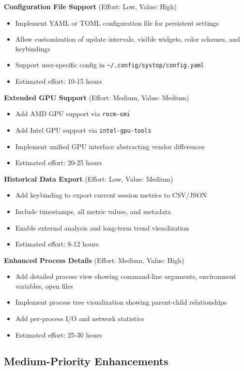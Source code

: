 \documentclass[12pt,a4paper,oneside]{report}
\begin{document}
\textbf{Configuration File Support} (Effort: Low, Value: High)
\begin{itemize}
    \item Implement YAML or TOML configuration file for persistent settings
    \item Allow customization of update intervals, visible widgets, color schemes, and keybindings
    \item Support user-specific config in \texttt{\textasciitilde/.config/systop/config.yaml}
    \item Estimated effort: 10-15 hours
\end{itemize}

\textbf{Extended GPU Support} (Effort: Medium, Value: Medium)
\begin{itemize}
    \item Add AMD GPU support via \texttt{rocm-smi}
    \item Add Intel GPU support via \texttt{intel-gpu-tools}
    \item Implement unified GPU interface abstracting vendor differences
    \item Estimated effort: 20-25 hours
\end{itemize}

\textbf{Historical Data Export} (Effort: Low, Value: Medium)
\begin{itemize}
    \item Add keybinding to export current session metrics to CSV/JSON
    \item Include timestamps, all metric values, and metadata
    \item Enable external analysis and long-term trend visualization
    \item Estimated effort: 8-12 hours
\end{itemize}

\textbf{Enhanced Process Details} (Effort: Medium, Value: High)
\begin{itemize}
    \item Add detailed process view showing command-line arguments, environment variables, open files
    \item Implement process tree visualization showing parent-child relationships
    \item Add per-process I/O and network statistics
    \item Estimated effort: 25-30 hours
\end{itemize}

\subsection{Medium-Priority Enhancements}
\end{document}
